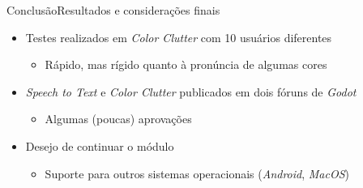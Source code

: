 \begin{frame}{Conclusão}{Resultados e considerações finais}

\begin{itemize}
\item Testes realizados em \textit{Color Clutter} com 10 usuários diferentes
\begin{itemize}
    \item<2-> Rápido, mas rígido quanto à pronúncia de algumas cores
\end{itemize}

\item<3-> \textit{Speech to Text} e \textit{Color Clutter} publicados em dois fóruns de \textit{Godot}
\begin{itemize}
  \item Algumas (poucas) aprovações
\end{itemize}

\item<4-> Desejo de continuar o módulo
\begin{itemize}
\item Suporte para outros sistemas operacionais (\textit{Android}, \textit{MacOS})
\end{itemize}

\end{itemize}
\end{frame}
